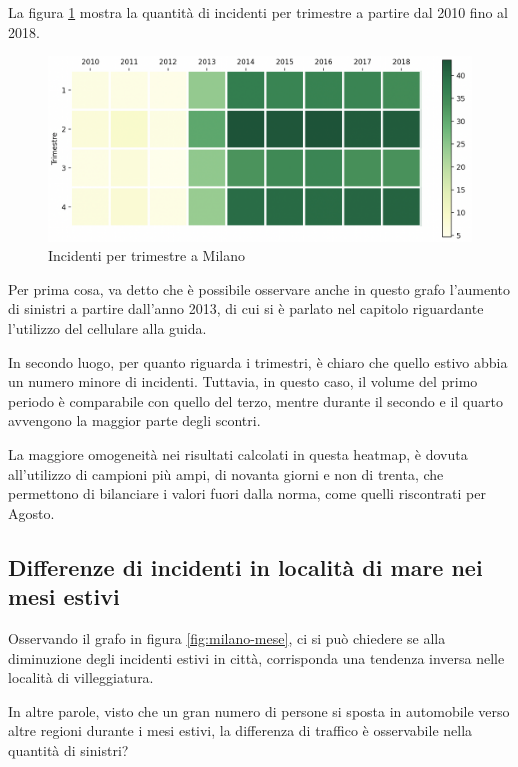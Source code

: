 \documentclass[a4paper,12pt]{report}
\begin{document}
La figura \ref{fig:milano-trimestri} mostra la quantità di incidenti per 
trimestre a partire dal 2010 fino al 2018. 

\begin{figure}
    \includegraphics[width=\linewidth]{../src/incidenti/incidenti_senza_coords/mese_incidenti/trimestri.png}
    \caption{Incidenti per trimestre a Milano}
    \label{fig:milano-trimestri}
\end{figure}

Per prima cosa, va detto che è possibile osservare anche in questo grafo 
l'aumento di sinistri a partire dall'anno 2013, di cui si è parlato nel capitolo 
riguardante l'utilizzo del cellulare alla guida. 

In secondo luogo, per quanto riguarda i trimestri, è chiaro che quello estivo abbia 
un numero minore di incidenti. 
Tuttavia, in questo caso, il volume del primo periodo è comparabile 
con quello del terzo, 
mentre durante il secondo e il quarto avvengono la maggior parte degli scontri. 

La maggiore omogeneità nei risultati calcolati in questa heatmap, 
è dovuta all'utilizzo di campioni più ampi, di novanta giorni e non di trenta, 
che permettono di bilanciare i valori fuori dalla norma, 
come quelli riscontrati per Agosto. 

\subsection{Differenze di incidenti in località di mare nei mesi estivi}

Osservando il grafo in figura \ref{fig:milano-mese}, 
ci si può chiedere se alla diminuzione degli incidenti estivi in città, 
corrisponda una tendenza inversa nelle località di villeggiatura.

In altre parole, visto che un gran numero di persone si sposta in automobile 
verso altre regioni durante i mesi estivi, la differenza di traffico è osservabile 
nella quantità di sinistri?
\end{document}

